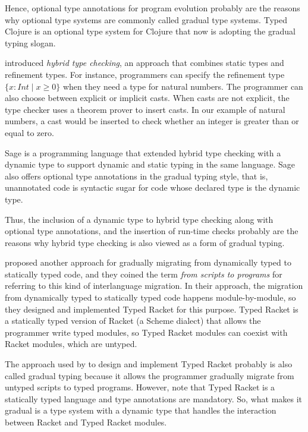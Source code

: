 \documentclass[preprint]{sig-alternate}
\begin{document}
Hence, optional type annotations for program evolution probably are
the reasons why optional type systems are commonly called
gradual type systems.
Typed Clojure \cite{bonnaire-sergeant2012typed-clojure} is an
optional type system for Clojure that now is adopting the
gradual typing slogan.

\cite{flanagan2006htc} introduced \textit{hybrid type checking},
an approach that combines static types and refinement types.
For instance, programmers can specify the refinement type
$\{x:Int \;|\; x \ge 0\}$ when they need a type for natural numbers.
The programmer can also choose between explicit or implicit casts.
When casts are not explicit, the type checker uses a theorem prover
to insert casts.
In our example of natural numbers, a cast would be inserted to check
whether an integer is greater than or equal to zero.

Sage \cite{gronski2006sage} is a programming language that
extended hybrid type checking with a dynamic type to
support dynamic and static typing in the same language.
Sage also offers optional type annotations in the gradual typing
style, that is, unannotated code is syntactic sugar for
code whose declared type is the dynamic type.

Thus, the inclusion of a dynamic type to hybrid type checking
along with optional type annotations, and the insertion of run-time
checks probably are the reasons why hybrid type checking is
also viewed as a form of gradual typing. 

\cite{tobin-hochstadt2006ims} proposed another approach for gradually
migrating from dynamically typed to statically typed code,
and they coined the term \textit{from scripts to programs} for
referring to this kind of interlanguage migration.
In their approach, the migration from dynamically typed to
statically typed code happens module-by-module, so they designed
and implemented Typed Racket \cite{tobin-hochstadt2008ts} for
this purpose.
Typed Racket is a statically typed version of Racket
(a Scheme dialect) that allows the programmer write typed modules,
so Typed Racket modules can coexist with Racket modules,
which are untyped.

The approach used by \cite{tobin-hochstadt2008ts} to design and
implement Typed Racket probably is also called gradual typing
because it allows the programmer gradually migrate from untyped
scripts to typed programs.
However, note that Typed Racket is a statically typed language
and type annotations are mandatory.
So, what makes it gradual is a type system with a dynamic type
that handles the interaction between Racket and Typed Racket modules.
\end{document}
